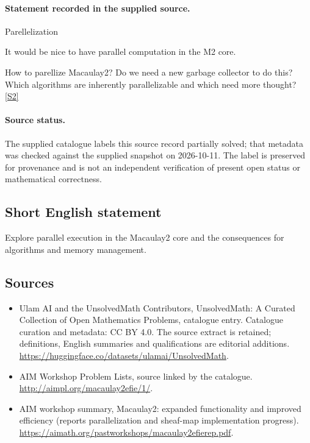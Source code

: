 \documentclass[11pt]{article}
\newcommand{\sref}[2]{\hyperlink{source:#1:#2}{[S#2]}}
\begin{document}
\paragraph{Statement recorded in the supplied source.}
Parellelization

It would be nice to have parallel computation in the M2 core.

How to parellize Macaulay2? Do we need a new garbage collector to do this? Which algorithms are inherently parallelizable and which need more thought? \sref{statement}{2}
\paragraph{Source status.}
The supplied catalogue labels this source record partially solved; that metadata was checked against the supplied snapshot on 2026-10-11. The label is preserved for provenance and is not an independent verification of present open status or mathematical correctness.
\subsection{Short English statement}
Explore parallel execution in the Macaulay2 core and the consequences for algorithms and memory management.
\subsection{Sources}
\begin{itemize}
\item[\hypertarget{source:statement:1}{S1}] Ulam AI and the UnsolvedMath Contributors, UnsolvedMath: A Curated Collection of Open Mathematics Problems, catalogue entry. Catalogue curation and metadata: CC BY 4.0. The source extract is retained; definitions, English summaries and qualifications are editorial additions.
\url{https://huggingface.co/datasets/ulamai/UnsolvedMath}.
\item[\hypertarget{source:statement:2}{S2}] AIM Workshop Problem Lists, source linked by the catalogue.
\url{http://aimpl.org/macaulay2efie/1/}.
\item[\hypertarget{source:statement:3}{S3}] AIM workshop summary, Macaulay2: expanded functionality and improved efficiency (reports parallelization and sheaf-map implementation progress).
\url{https://aimath.org/pastworkshops/macaulay2efierep.pdf}.
\end{itemize}
\end{document}
